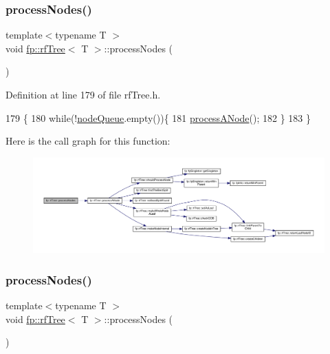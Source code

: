 \subsubsection{\texorpdfstring{process\+Nodes()}{processNodes()}\hspace{0.1cm}{\footnotesize\ttfamily [1/2]}}
{\footnotesize\ttfamily template$<$typename T $>$ \\
void \hyperlink{classfp_1_1rfTree}{fp\+::rf\+Tree}$<$ T $>$\+::process\+Nodes (\begin{DoxyParamCaption}{ }\end{DoxyParamCaption})\hspace{0.3cm}{\ttfamily [inline]}}



Definition at line 179 of file rf\+Tree.\+h.


\begin{DoxyCode}
179                                    \{
180                     \textcolor{keywordflow}{while}(!\hyperlink{classfp_1_1rfTree_af72d0a2f930fd480dfb4858885c2df23}{nodeQueue}.empty())\{
181                         \hyperlink{classfp_1_1rfTree_ab7760333f6857ab7ce2ee29a7bc16e65}{processANode}();
182                     \}
183                 \}
\end{DoxyCode}
Here is the call graph for this function\+:
\nopagebreak
\begin{figure}[H]
\begin{center}
\leavevmode
\includegraphics[width=350pt]{classfp_1_1rfTree_a7997df3477bc9f73163384c8cd0bcec9_cgraph}
\end{center}
\end{figure}
\mbox{\label{classfp_1_1rfTree_a7997df3477bc9f73163384c8cd0bcec9}} 
\subsubsection{\texorpdfstring{process\+Nodes()}{processNodes()}\hspace{0.1cm}{\footnotesize\ttfamily [2/2]}}
{\footnotesize\ttfamily template$<$typename T $>$ \\
void \hyperlink{classfp_1_1rfTree}{fp\+::rf\+Tree}$<$ T $>$\+::process\+Nodes (\begin{DoxyParamCaption}{ }\end{DoxyParamCaption})\hspace{0.3cm}{\ttfamily [inline]}}



